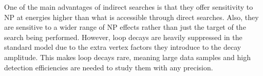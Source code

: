 One of the main advantages of indirect searches is that they offer sensitivity to NP at energies higher than what is accessible through direct searches.  Also, they are sensitive to a wider range of NP effects rather than just the target of the search being performed.  However, loop decays are heavily suppressed in the standard model due to the extra vertex factors they introduce to the decay amplitude.  This makes loop decays rare, meaning large data samples and high detection efficiencies are needed to study them with any precision.








